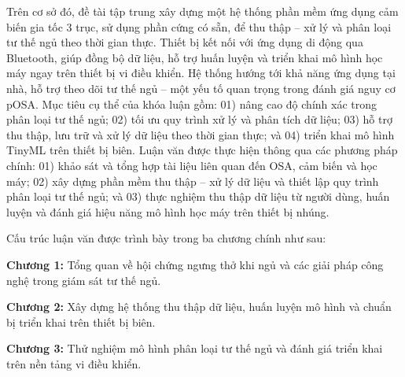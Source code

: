 Trên cơ sở đó, đề tài tập trung xây dựng một hệ thống phần mềm ứng dụng cảm biến gia tốc 3 trục, 
sử dụng phần cứng có sẵn, để thu thập – xử lý và phân loại tư thế ngủ theo thời gian thực. 
Thiết bị kết nối với ứng dụng di động qua Bluetooth, giúp đồng bộ dữ liệu, 
hỗ trợ huấn luyện và triển khai mô hình học máy ngay trên thiết bị 
vi điều khiển. Hệ thống hướng tới khả năng ứng dụng tại nhà, 
hỗ trợ theo dõi tư thế ngủ – một yếu tố quan trọng trong đánh giá nguy cơ pOSA. Mục tiêu cụ thể của khóa luận gồm: 
01) nâng cao độ chính xác trong phân loại tư thế ngủ; 
02) tối ưu quy trình xử lý và phân tích dữ liệu; 
03) hỗ trợ thu thập, lưu trữ và xử lý dữ liệu theo thời gian thực; 
và 04) triển khai mô hình TinyML trên thiết bị biên.
Luận văn được thực hiện thông qua các phương pháp chính: 01) khảo sát và tổng hợp tài liệu liên quan đến OSA, cảm biến và học máy; 
02) xây dựng phần mềm thu thập – xử lý dữ liệu và thiết lập quy trình phân loại tư thế ngủ; 
và 03) thực nghiệm thu thập dữ liệu từ người dùng, huấn luyện và đánh giá hiệu năng mô hình học máy trên thiết bị nhúng.


Cấu trúc luận văn được trình bày trong ba chương chính như sau:

\noindent\textbf{Chương 1:} Tổng quan về hội chứng ngưng thở khi ngủ và các giải pháp công nghệ trong giám sát tư thế ngủ.

\noindent\textbf{Chương 2:} Xây dựng hệ thống thu thập dữ liệu, huấn luyện mô hình và chuẩn bị triển khai trên thiết bị biên.

\noindent\textbf{Chương 3:} Thử nghiệm mô hình phân loại tư thế ngủ và đánh giá triển khai trên nền tảng vi điều khiển.
